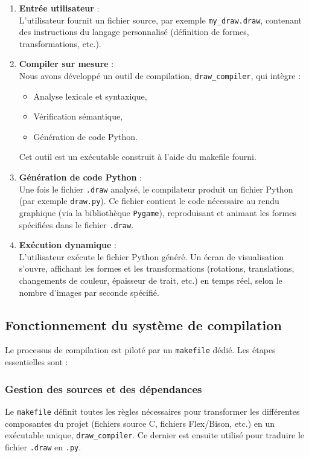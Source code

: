 \documentclass[12pt,a4paper]{article}
\begin{document}
\begin{enumerate}
    \item \textbf{Entrée utilisateur} : \\
    L’utilisateur fournit un fichier source, par exemple \texttt{my\_draw.draw}, contenant des instructions du langage personnalisé (définition de formes, transformations, etc.).

    \item \textbf{Compiler sur mesure} : \\
    Nous avons développé un outil de compilation, \texttt{draw\_compiler}, qui intègre :
    \begin{itemize}
        \item Analyse lexicale et syntaxique,
        \item Vérification sémantique,
        \item Génération de code Python.
    \end{itemize}
    Cet outil est un exécutable construit à l’aide du makefile fourni.

    \item \textbf{Génération de code Python} : \\
    Une fois le fichier \texttt{.draw} analysé, le compilateur produit un fichier Python (par exemple \texttt{draw.py}). Ce fichier contient le code nécessaire au rendu graphique (via la bibliothèque \texttt{Pygame}), reproduisant et animant les formes spécifiées dans le fichier \texttt{.draw}.

    \item \textbf{Exécution dynamique} : \\
    L’utilisateur exécute le fichier Python généré. Un écran de visualisation s’ouvre, affichant les formes et les transformations (rotations, translations, changements de couleur, épaisseur de trait, etc.) en temps réel, selon le nombre d’images par seconde spécifié.
\end{enumerate}

\subsection{Fonctionnement du système de compilation}

Le processus de compilation est piloté par un \texttt{makefile} dédié. Les étapes essentielles sont :

\subsubsection{Gestion des sources et des dépendances}
Le \texttt{makefile} définit toutes les règles nécessaires pour transformer les différentes composantes du projet (fichiers source C, fichiers Flex/Bison, etc.) en un exécutable unique, \texttt{draw\_compiler}. Ce dernier est ensuite utilisé pour traduire le fichier \texttt{.draw} en \texttt{.py}.
\end{document}
